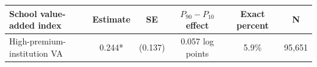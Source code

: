 \begin{tabular}{lccccc}
\toprule
School value-added index & Estimate & SE & $P_{90}-P_{10}$ effect & Exact percent & N \\
\midrule
High-premium-institution VA & 0.244* & (0.137) & 0.057 log points & 5.9\% & 95,651 \\
\bottomrule
\end{tabular}
